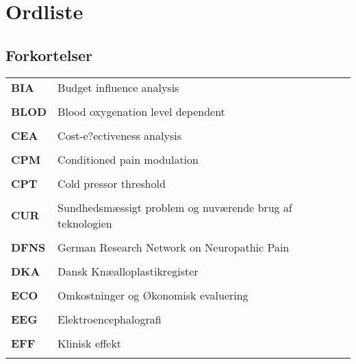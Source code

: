 \chapter*{Ordliste} \label{ordliste}
\vspace{-.75cm}
\section*{Forkortelser}
\vspace{0.75cm}
\begin{longtable}{p{}  p{}}

\textbf{BIA} & Budget influence analysis                                
\\ \\
\textbf{BLOD}& Blood oxygenation level dependent                        
\\ \\
\textbf{CEA} & Cost-e?ectiveness analysis                               
\\ \\
\textbf{CPM} & Conditioned pain modulation                              
\\ \\
\textbf{CPT} & Cold pressor threshold                                   
\\ \\
\textbf{CUR} & Sundhedsmæssigt problem og nuværende brug af teknologien 
\\ \\
\textbf{DFNS}& German Research Network on Neuropathic Pain              
\\ \\
\textbf{DKA} & Dansk Knæalloplastikregister                             
\\ \\
\textbf{ECO} & Omkostninger og Økonomisk evaluering                     
\\ \\
\textbf{EEG} & Elektroencephalografi                                     
\\ \\
\textbf{EFF} & Klinisk effekt                                           
\\ \\

\end{longtable}
